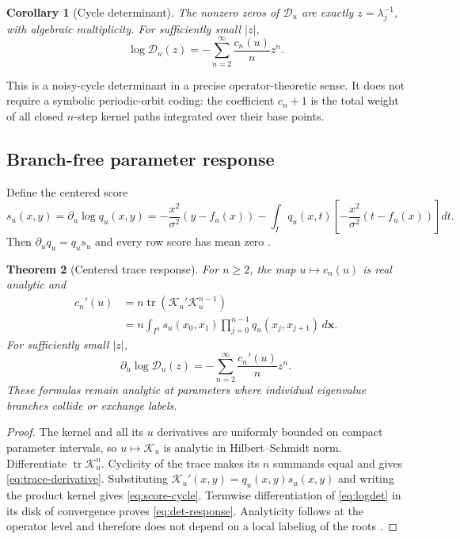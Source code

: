\documentclass[11pt]{article}
\newtheorem{theorem}{Theorem}[section]
\newtheorem{corollary}[theorem]{Corollary}
\theoremstyle{definition}
\theoremstyle{remark}
\newcommand{\cK}{\mathcal K}
\newcommand{\cD}{\mathcal D}
\newcommand{\tr}{\operatorname{tr}}
\begin{document}
\begin{corollary}[Cycle determinant]
\label{cor:determinant}
The nonzero zeros of $\cD_u$ are exactly $z=\lambda_j^{-1}$, with algebraic
multiplicity.  For sufficiently small $|z|$,
\begin{equation}\label{eq:logdet}
 \log\cD_u(z)=-\sum_{n=2}^{\infty}\frac{c_n(u)}{n}z^n.
\end{equation}
\end{corollary}

This is a noisy-cycle determinant in a precise operator-theoretic sense.  It
does not require a symbolic periodic-orbit coding: the coefficient $c_n+1$ is
the total weight of all closed $n$-step kernel paths integrated over their
base points.

\subsection{Branch-free parameter response}

Define the centered score
\begin{equation}\label{eq:score}
 s_u(x,y)=\partial_u\log q_u(x,y)
 =-\frac{x^2}{\sigma^2}(y-f_u(x))
 -\int_Iq_u(x,t)\left[-\frac{x^2}{\sigma^2}(t-f_u(x))\right]dt.
\end{equation}
Then $\partial_uq_u=q_us_u$ and every row score has mean zero
\citep{WangGaussianResponse2026,WangContinuum2026}.

\begin{theorem}[Centered trace response]
\label{thm:trace-response}
For $n\ge2$, the map $u\mapsto c_n(u)$ is real analytic and
\begin{align}
 c_n'(u)
 &=n\tr(\cK_u'\cK_u^{n-1})\label{eq:trace-derivative}\\
 &=n\int_{I^n}s_u(x_0,x_1)
 \prod_{j=0}^{n-1}q_u(x_j,x_{j+1})
 \,d\boldsymbol{x}.
 \label{eq:score-cycle}
\end{align}
For sufficiently small $|z|$,
\begin{equation}\label{eq:det-response}
 \partial_u\log\cD_u(z)
 =-\sum_{n=2}^{\infty}\frac{c_n'(u)}{n}z^n.
\end{equation}
These formulas remain analytic at parameters where individual eigenvalue
branches collide or exchange labels.
\end{theorem}

\begin{proof}
The kernel and all its $u$ derivatives are uniformly bounded on compact
parameter intervals, so $u\mapsto\cK_u$ is analytic in Hilbert--Schmidt norm.
Differentiate $\tr\cK_u^n$.  Cyclicity of the trace makes its $n$ summands
equal and gives \eqref{eq:trace-derivative}.  Substituting
$\cK_u'(x,y)=q_u(x,y)s_u(x,y)$ and writing the product kernel gives
\eqref{eq:score-cycle}.  Termwise differentiation of \eqref{eq:logdet} in its
disk of convergence proves \eqref{eq:det-response}.  Analyticity follows at
the operator level and therefore does not depend on a local labeling of the
roots \citep{Kato1995}.
\end{proof}
\end{document}
